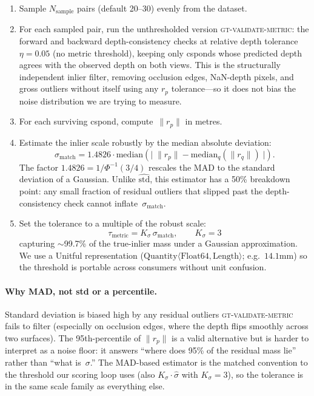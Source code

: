 \documentclass{article}
\begin{document}
		\begin{enumerate}
			\item Sample $N_{\mathrm{sample}}$ pairs (default 20--30) evenly
			      from the dataset.
			\item For each sampled pair, run the unthresholded version
			      \textsc{gt-validate-metric}: the forward and backward
			      depth-consistency checks at relative depth tolerance
			      $\eta = 0.05$ (no metric threshold), keeping only csponds whose
			      predicted depth agrees with the observed depth on both views.
			      This is the structurally independent inlier filter, removing
			      occlusion edges, NaN-depth pixels, and gross outliers without
			      itself using any $r_p$ tolerance---so it does not bias the
			      noise distribution we are trying to measure.
			\item For each surviving cspond, compute~$\|r_p\|$ in metres.
			\item Estimate the inlier scale robustly by the median absolute
			      deviation:
			      \begin{equation}
				      \sigma_{\mathrm{match}}
				      = 1.4826 \cdot
				      \mathrm{median}\!\left(
				      \bigl|\;\|r_p\| - \mathrm{median}_q(\|r_q\|)\;\bigr|
				      \right).
			      \end{equation}
			      The factor $1.4826 = 1/\Phi^{-1}(3/4)$ rescales the MAD to the
			      standard deviation of a Gaussian.  Unlike $\widehat{\mathrm{std}}$,
			      this estimator has a 50\% breakdown point: any small fraction of
			      residual outliers that slipped past the depth-consistency check
			      cannot inflate~$\sigma_{\mathrm{match}}$.
			\item Set the tolerance to a multiple of the robust scale:
			      \begin{equation}
				      \tau_{\mathrm{metric}} = K_{\sigma}\,\sigma_{\mathrm{match}},
				      \qquad K_{\sigma} = 3
			      \end{equation}
			      capturing $\sim$99.7\% of the true-inlier mass under a Gaussian
			      approximation.  We use a Unitful representation
			      ($\mathrm{Quantity}\langle\mathrm{Float64}, \mathrm{Length}\rangle$;
			      e.g.\ $14.1\text{mm}$) so the threshold is portable across
			      consumers without unit confusion.
		\end{enumerate}

		\paragraph{Why MAD, not std or a percentile.}
		Standard deviation is biased high by any residual outliers
		\textsc{gt-validate-metric} fails to filter (especially on
		occlusion edges, where the depth flips smoothly across two
		surfaces).  The 95th-percentile of $\|r_p\|$ is a valid
		alternative but is harder to interpret as a noise floor: it
		answers ``where does 95\% of the residual mass lie'' rather
		than ``what is~$\sigma$.''  The MAD-based estimator is the
		matched convention to the threshold our scoring loop uses
		(also $K_\sigma\cdot\hat\sigma$ with $K_\sigma{=}3$), so the
		tolerance is in the same scale family as everything else.
\end{document}
